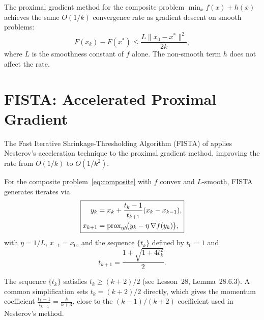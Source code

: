 \documentclass[11pt,a4paper]{article}
\begin{document}
\begin{keyresult}[title={Proximal Gradient Convergence}]
The proximal gradient method for the composite problem $\min_x f(x)+h(x)$
achieves the same $O(1/k)$ convergence rate as gradient descent on
smooth problems:
\[
  F(x_k) - F(x^*) \le \frac{L\|x_0 - x^*\|^2}{2k},
\]
where $L$ is the smoothness constant of $f$ alone. The non-smooth term
$h$ does not affect the rate.
\end{keyresult}


\section{FISTA: Accelerated Proximal Gradient}\label{sec:fista}

The Fast Iterative Shrinkage-Thresholding Algorithm (FISTA) of
\citet{beck2009} applies Nesterov's acceleration technique to the
proximal gradient method, improving the rate from $O(1/k)$ to $O(1/k^2)$.

\begin{definition}[FISTA]\label{def:fista}
For the composite problem~\eqref{eq:composite} with $f$ convex and
$L$-smooth, FISTA generates iterates via
\begin{equation}\label{eq:fista}
\boxed{
\begin{aligned}
  y_k &= x_k + \frac{t_k - 1}{t_{k+1}}(x_k - x_{k-1}), \\
  x_{k+1} &= \operatorname{prox}_{\eta h}\!\bigl(y_k - \eta\,\nabla f(y_k)\bigr),
\end{aligned}
}
\end{equation}
with $\eta = 1/L$, $x_{-1} = x_0$, and the sequence $\{t_k\}$
defined by $t_0 = 1$ and
\begin{equation}\label{eq:fista-tk}
  t_{k+1} = \frac{1 + \sqrt{1 + 4t_k^2}}{2}.
\end{equation}
\end{definition}

\begin{remark}\label{rem:simplified-momentum}
The sequence $\{t_k\}$ satisfies $t_k \ge (k+2)/2$ (see Lesson~28,
Lemma~28.6.3). A common simplification sets $t_k = (k+2)/2$ directly,
which gives the momentum coefficient
$\frac{t_k - 1}{t_{k+1}} = \frac{k}{k+3}$, close to the
$(k-1)/(k+2)$ coefficient used in Nesterov's method.
\end{remark}
\end{document}

